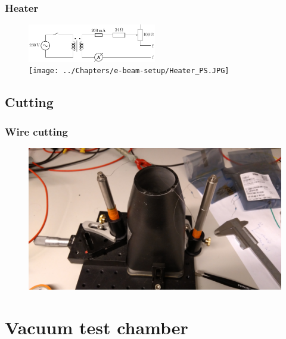\documentclass[aspectratio=169]{beamer}
\begin{document}

\begin{frame}
	\frametitle{Heater}
	\begin{figure}[ht]
		\centering
		\includegraphics[width=0.5\textwidth]{../Figures/Thesis-figure0.pdf} \\
		\vspace{0.5cm}
		\texttt{[image: ../Chapters/e-beam-setup/Heater\_PS.JPG]}
	\end{figure}
\end{frame}

\subsection{Cutting}

\begin{frame}
	\frametitle{Wire cutting}
	\begin{figure}[ht]
		\includegraphics[width=.8\textwidth]{../Chapters/CRT-handling/Cutting_Stage.jpg}
	\end{figure}
\end{frame}

\section{Vacuum test chamber}
\end{document}
